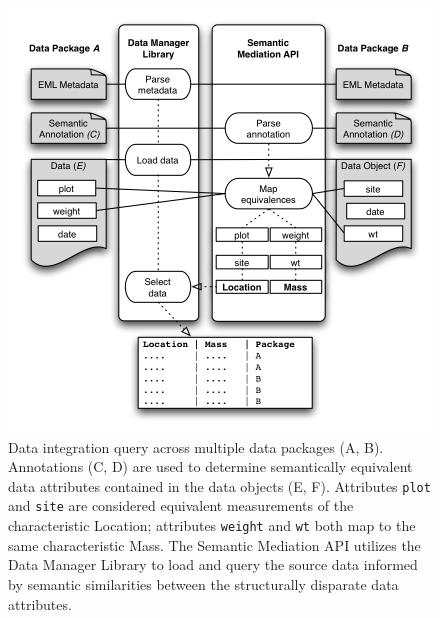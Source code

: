 \begin{figure}
\centering
\includegraphics[scale=1.0]{images/integration.png}
\caption{Data integration query across multiple data packages (A, B).
  Annotations (C, D) are used to determine semantically equivalent
  data attributes contained in the data objects (E, F). Attributes
  {\tt plot} and {\tt site} are considered equivalent measurements of the
  characteristic Location; attributes {\tt weight} and {\tt wt} both map to
  the same characteristic Mass. The Semantic Mediation API utilizes
  the Data Manager Library to load and query the source data informed
  by semantic similarities between the structurally disparate data
  attributes.}
\label{fig:integration}
\end{figure}

